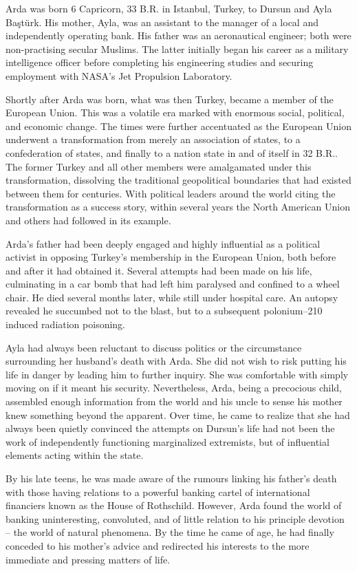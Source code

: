 Arda was born 6 Capricorn, 33 B.R. in Istanbul, Turkey, to Dursun and Ayla Baştürk. His mother, Ayla, was an assistant to the manager of a local and independently operating bank. His father was an aeronautical engineer; both were non-practising secular Muslims. The latter initially began his career as a military intelligence officer before completing his engineering studies and securing employment with NASA's Jet Propulsion Laboratory.

Shortly after Arda was born, what was then Turkey, became a member of the European Union. This was a volatile era marked with enormous social, political, and economic change. The times were further accentuated as the European Union underwent a transformation from merely an association of states, to a confederation of states, and finally to a nation state in and of itself in 32 B.R.. The former Turkey and all other members were amalgamated under this transformation, dissolving the traditional geopolitical boundaries that had existed between them for centuries. With political leaders around the world citing the transformation as a success story, within several years the North American Union and others had followed in its example.

Arda's father had been deeply engaged and highly influential as a political activist in opposing Turkey's membership in the European Union, both before and after it had obtained it. Several attempts had been made on his life, culminating in a car bomb that had left him paralysed and confined to a wheel chair. He died several months later, while still under hospital care. An autopsy revealed he succumbed not to the blast, but to a subsequent polonium--210 induced radiation poisoning.

Ayla had always been reluctant to discuss politics or the circumstance surrounding her husband's death with Arda. She did not wish to risk putting his life in danger by leading him to further inquiry. She was comfortable with simply moving on if it meant his security. Nevertheless, Arda, being a precocious child, assembled enough information from the world and his uncle to sense his mother knew something beyond the apparent. Over time, he came to realize that she had always been quietly convinced the attempts on Dursun's life had not been the work of independently functioning marginalized extremists, but of influential elements acting within the state.

By his late teens, he was made aware of the rumours linking his father's death with those having relations to a powerful banking cartel of international financiers known as the House of Rothschild. However, Arda found the world of banking uninteresting, convoluted, and of little relation to his principle devotion -- the world of natural phenomena. By the time he came of age, he had finally conceded to his mother's advice and redirected his interests to the more immediate and pressing matters of life.

